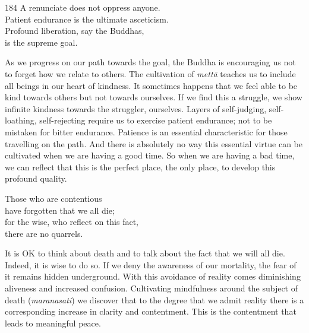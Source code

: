 
\begin{dhpVerse}{184}
\label{dhp-184}
A renunciate does not oppress anyone.\\
Patient endurance is the ultimate asceticism.\\
Profound liberation, say the Buddhas,\\
is the supreme goal.
\end{dhpVerse}

\begin{dhpRefl}

As we progress on our path towards the goal, the Buddha is
encouraging us not to forget how we relate to others. The
cultivation of \emph{mettā} teaches us to include all beings in our heart of
kindness. It sometimes happens that we feel able to be kind towards
others but not towards ourselves. If we find this a struggle, we show
infinite kindness towards the struggler, ourselves. Layers of
self-judging, self-loathing, self-rejecting require us to exercise
patient endurance; not to be mistaken for bitter endurance. Patience
is an essential characteristic for those travelling on the path. And
there is absolutely no way this essential virtue can be cultivated
when we are having a good time. So when we are having a bad time,
we can reflect that this is the perfect place, the only place, to develop
this profound quality.

\end{dhpRefl}


\begin{dhpVerse}{6}
\label{dhp-6}
Those who are contentious\\
have forgotten that we all die;\\
for the wise, who reflect on this fact,\\
there are no quarrels.
\end{dhpVerse}

\begin{dhpRefl}

It is OK to think about death and to talk about the fact that we will all
die. Indeed, it is wise to do so. If we deny the awareness of our
mortality, the fear of it remains hidden underground. With this
avoidance of reality comes diminishing aliveness and increased
confusion. Cultivating mindfulness around the subject of death
(\emph{maranasati}) we discover that to the degree that we admit reality there is
a corresponding increase in clarity and contentment. This is the
contentment that leads to meaningful peace.

\end{dhpRefl}

